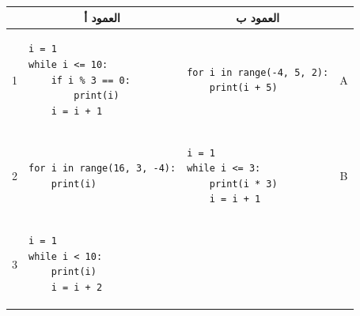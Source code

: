 \documentclass[14pt]{extarticle}
\begin{document}
{\small
\renewcommand{\arraystretch}{1.3}
\begin{longtable}{|c|p{}|p{}|c|}
\hline
\multicolumn{1}{|c|}{} & \multicolumn{1}{c|}{\textbf{العمود أ}} & \multicolumn{1}{c|}{\textbf{العمود ب}} & \multicolumn{1}{c|}{} \\
\hline
\endhead
1 &
\begin{pycell}
\begin{english}
\begin{verbatim}
i = 1
while i <= 10:
    if i % 3 == 0:
        print(i)
    i = i + 1
\end{verbatim}
\end{english}
\end{pycell} &
\begin{pycell}
\begin{english}
\begin{verbatim}
for i in range(-4, 5, 2):
    print(i + 5)
\end{verbatim}
\end{english}
\end{pycell} & \textenglish{A} \\
\hline
2 &
\begin{pycell}
\begin{english}
\begin{verbatim}
for i in range(16, 3, -4):
    print(i)
\end{verbatim}
\end{english}
\end{pycell} &
\begin{pycell}
\begin{english}
\begin{verbatim}
i = 1
while i <= 3:
    print(i * 3)
    i = i + 1
\end{verbatim}
\end{english}
\end{pycell} & \textenglish{B} \\
\hline
3 &
\begin{pycell}
\begin{english}
\begin{verbatim}
i = 1
while i < 10:
    print(i)
    i = i + 2
\end{verbatim}
\end{english}
\end{pycell} &
\begin{pycell}
\begin{english}

\end{english}
\end{pycell}
\end{longtable}}
\end{document}

